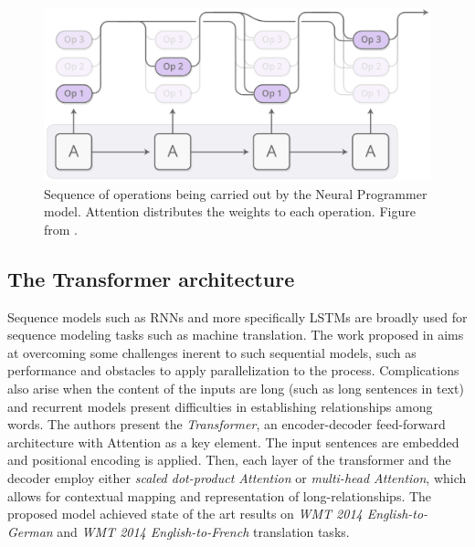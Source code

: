 \documentclass[English]{style/ic-tese-v3}
\begin{document}
\begin{figure}
\begin{center}
    \includegraphics[width=0.7\linewidth]{./img/neural-programmer.png}
\caption{
    Sequence of operations being carried out by the Neural Programmer model.
    Attention distributes the weights to each operation.
    Figure from \cite{ref:distill}.
}
\label{fig:np}
\end{center}
\end{figure}

\subsection{The Transformer architecture}
Sequence models such as RNNs and more specifically LSTMs are broadly used for sequence modeling tasks such
as machine translation.
The work proposed in \cite{ref:transformer} aims at overcoming some challenges inerent to such sequential
models, such as performance and obstacles to apply parallelization to the process.
Complications also arise when the content of the inputs are long (such as long sentences in text) and
recurrent models present difficulties in establishing relationships among words.
The authors present the \emph{Transformer}, an encoder-decoder feed-forward architecture with
Attention as a key element.
The input sentences are embedded and positional encoding is applied.
Then, each layer of the transformer and the decoder employ either \emph{scaled dot-product Attention} or
\emph{multi-head Attention}, which allows for contextual mapping and representation of long-relationships.
The proposed model achieved state of the art results on \emph{WMT 2014 English-to-German} and
\emph{WMT 2014 English-to-French} translation tasks.
\end{document}
